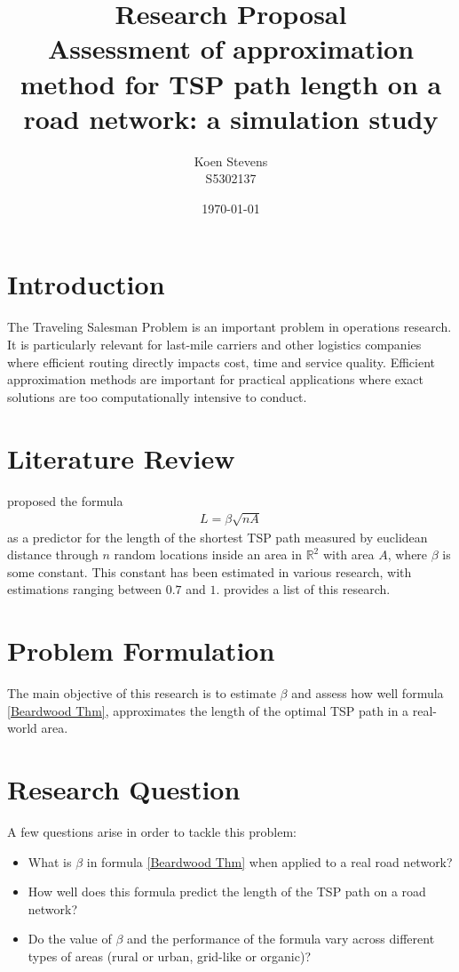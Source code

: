 \documentclass[a4paper,11pt]{article}
\title{Research Proposal\\
  Assessment of approximation method for TSP path length on a road
network: a simulation study}
\author{Koen Stevens\\
S5302137}
\date{\today}
\newcommand{\1}[1]{\,I_{#1}} %
\begin{document}
\maketitle
\section{Introduction}
The Traveling Salesman Problem is an important problem in operations
research. It is particularly relevant for last-mile carriers and
other logistics companies where efficient routing directly impacts
cost, time and service quality. Efficient approximation methods are
important for practical applications where exact solutions are too
computationally intensive to conduct.
\section{Literature Review}
\cite{beardwood1959shortest} proposed the formula
\begin{align}
	L=\beta\sqrt{nA}
	\label{Beardwood Thm}
\end{align}
as a predictor for the length of the shortest TSP path measured by
euclidean distance through $n$ random locations inside an area in
$\mathbb{R}^2$ with area $A$, where $\beta$ is some constant. This
constant has been estimated in various research, with estimations
ranging between $0.7$ and $1$. \cite{doi:10.1177/03611981211049433}
provides a list of this research.
\section{Problem Formulation}
The main objective of this research is to estimate $\beta$ and assess
how well formula \ref{Beardwood Thm}, approximates the length of the
optimal TSP path in a real-world area.
\section{Research Question}
A few questions arise in order to tackle this problem:
\begin{itemize}
	\item What is $\beta$ in formula \ref{Beardwood Thm} when applied
	      to a real road network?
	\item How well does this formula predict the length of the TSP path
	      on a road network?
	\item Do the value of $\beta$ and the performance of the formula
	      vary across different types of areas (rural or urban, grid-like or organic)?
\end{itemize}
\end{document}
